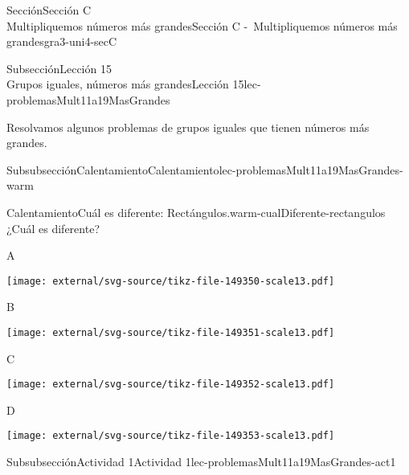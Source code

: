 \begin{sectionptx}{Sección}{{\Large Sección C\\}Multipliquemos números más grandes}{}{Sección C -~Multipliquemos números más grandes}{}{}{gra3-uni4-secC}
%
\begin{subsectionptx}{Subsección}{{\normalsize Lección 15\\[-0.05cm]}Grupos iguales, números más grandes}{}{Lección 15}{}{}{lec-problemasMult11a19MasGrandes}
\begin{introduction}{}%
Resolvamos algunos problemas de grupos iguales que tienen números más grandes.%
\end{introduction}%
%
%
\typeout{************************************************}
\typeout{************************************************}
%
\begin{subsubsectionptx}{Subsubsección}{Calentamiento}{}{Calentamiento}{}{}{lec-problemasMult11a19MasGrandes-warm}
\begin{exploration}{Calentamiento}{Cuál es diferente: Rectángulos.}{warm-cualDiferente-rectangulos}%
¿Cuál es diferente?%
\begin{sidebyside}{2}{0}{0}{0}%
\begin{sbspanel}{0.5}%
A%
\par
\texttt{[image: external/svg-source/tikz-file-149350-scale13.pdf]}
\end{sbspanel}%
\begin{sbspanel}{0.5}%
B%
\par
\texttt{[image: external/svg-source/tikz-file-149351-scale13.pdf]}
\end{sbspanel}%
\end{sidebyside}%
\begin{sidebyside}{2}{0}{0}{0}%
\begin{sbspanel}{0.5}%
C%
\par
\texttt{[image: external/svg-source/tikz-file-149352-scale13.pdf]}
\end{sbspanel}%
\begin{sbspanel}{0.5}%
D%
\par
\texttt{[image: external/svg-source/tikz-file-149353-scale13.pdf]}
\end{sbspanel}%
\end{sidebyside}%
\end{exploration}%
\end{subsubsectionptx}
%
%
\typeout{************************************************}
\typeout{************************************************}
%
\begin{subsubsectionptx}{Subsubsección}{Actividad 1}{}{Actividad 1}{}{}{lec-problemasMult11a19MasGrandes-act1}

\end{subsubsectionptx}
\end{subsectionptx}
\end{sectionptx}
